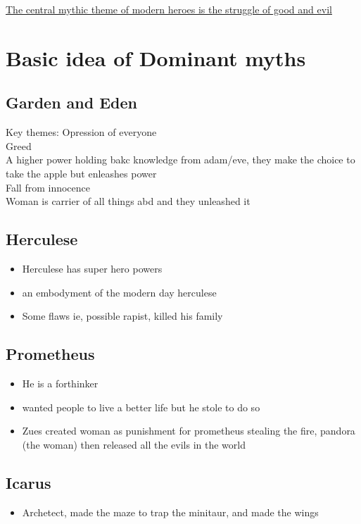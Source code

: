 \documentclass[12pt]{article}
\begin{document}
	\underline{The central mythic theme of modern heroes is the struggle of good and evil}\\
	
	\section*{Basic idea of Dominant myths}
	\subsection*{Garden and Eden}
	Key themes:
	Opression of everyone\\
	Greed\\
	A higher power holding bakc knowledge from adam/eve, they make the choice to take the apple but enleashes power\\
	Fall from innocence\\
	Woman is carrier of all things abd and they unleashed it\\
	
	\subsection*{Herculese}
	\begin{itemize}
		\item Herculese has super hero powers
		\item an embodyment of the modern day herculese
		\item Some flaws ie, possible rapist, killed his family
	\end{itemize}

	\subsection*{Prometheus}
	\begin{itemize}
		\item He is a forthinker
		\item wanted people to live a better life but he stole to do so
		\item Zues created woman as punishment for prometheus stealing the fire, pandora (the woman) then released all the evils in the world
	\end{itemize}

	\subsection*{Icarus}
	\begin{itemize}
		\item Archetect, made the maze to trap the minitaur, and made the wings
	\end{itemize}
\end{document}
